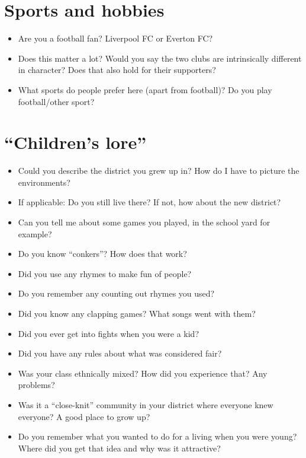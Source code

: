 	\section*{Sports and hobbies}
	\begin{multicols}{2}
		\begin{itemize}
			\item Are you a football fan? Liverpool FC or Everton FC?
			\item Does this matter a lot? Would you say the two clubs are intrinsically different in character? Does that also hold for their supporters?
			\item What sports do people prefer here (apart from football)? Do you play football/other sport?
		\end{itemize}
	\end{multicols}
	
	\section*{``Children’s lore''}
	\begin{multicols}{2}
		\begin{itemize}
			\item Could you describe the district you grew up in? How do I have to picture the environments?
			\item If applicable: Do you still live there? If not, how about the new district?
			\item Can you tell me about some games you played, in the school yard for example?
			\item Do you know ``conkers''? How does that work?
			\item Did you use any rhymes to make fun of people?
			\item Do you remember any counting out rhymes you used?
			\item Did you know any clapping games? What songs went with them?
			\item Did you ever get into fights when you were a kid?
			\item Did you have any rules about what was considered fair?
			\item Was your class ethnically mixed? How did you experience that? Any problems?
			\item Was it a ``close-knit'' community in your district where everyone knew everyone? A good place to grow up?
			\item Do you remember what you wanted to do for a living when you were young? Where did you get that idea and why was it attractive?
		\end{itemize}
	\end{multicols}
	
